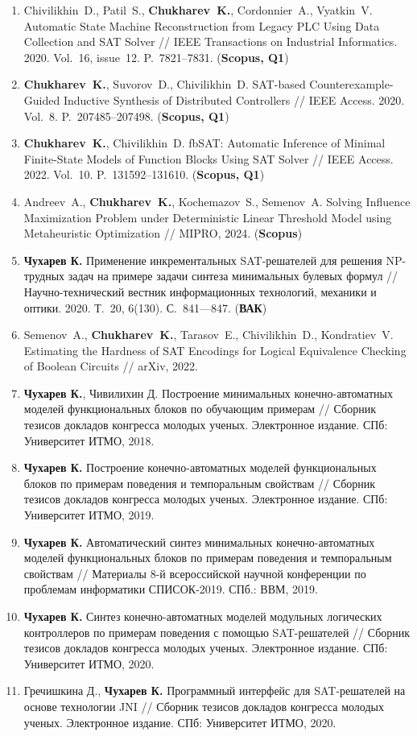 \begin{enumerate}[left=0pt]
    \item Chivilikhin~D., Patil~S., \textbf{Chukharev~K.}, Cordonnier~A., Vyatkin~V. Automatic State Machine Reconstruction from Legacy PLC Using Data Collection and SAT Solver // IEEE Transactions on Industrial Informatics. 2020. Vol.~16, issue~12. P.~7821–7831. (\textbf{Scopus, Q1})
    \item \textbf{Chukharev~K.}, Suvorov~D., Chivilikhin~D. SAT-based Counterexample-Guided Inductive Synthesis of Distributed Controllers // IEEE Access. 2020. Vol.~8. P.~207485–207498. (\textbf{Scopus, Q1})
    \item \textbf{Chukharev~K.}, Chivilikhin~D. fbSAT: Automatic Inference of Minimal Finite-State Models of Function Blocks Using SAT Solver // IEEE Access. 2022. Vol.~10. P.~131592–131610. (\textbf{Scopus, Q1})
    \item Andreev~A., \textbf{Chukharev~K.}, Kochemazov~S., Semenov~A. Solving Influence Maximization Problem under Deterministic Linear Threshold Model using Metaheuristic Optimization // MIPRO, 2024. (\textbf{Scopus})
    \item \textbf{Чухарев К.} Применение инкрементальных SAT-решателей для решения NP-трудных задач на примере задачи синтеза минимальных булевых формул // Научно-технический вестник информационных технологий, механики и оптики. 2020. Т.~20, 6(130). С.~841—847. (\textbf{ВАК})
    \item Semenov~A., \textbf{Chukharev~K.}, Tarasov~E., Chivilikhin~D., Kondratiev~V. Estimating the Hardness of SAT Encodings for Logical Equivalence Checking of Boolean Circuits // arXiv, 2022.
    \item \textbf{Чухарев К.}, Чивилихин Д. Построение минимальных конечно-автоматных моделей функциональных блоков по обучающим примерам // Сборник тезисов докладов конгресса молодых ученых. Электронное издание. СПб: Университет ИТМО, 2018.
    \item \textbf{Чухарев К.} Построение конечно-автоматных моделей функциональных блоков по примерам поведения и темпоральным свойствам // Сборник тезисов докладов конгресса молодых ученых. Электронное издание. СПб: Университет ИТМО, 2019.
    \item \textbf{Чухарев К.} Автоматический синтез минимальных конечно-автоматных моделей функциональных блоков по примерам поведения и темпоральным свойствам // Материалы 8-й всероссийской научной конференции по проблемам информатики СПИСОК-2019. СПб.: ВВМ, 2019.
    \item \textbf{Чухарев К.} Синтез конечно-автоматных моделей модульных логических контроллеров по примерам поведения с помощью SAT-решателей // Сборник тезисов докладов конгресса молодых ученых. Электронное издание. СПб: Университет ИТМО, 2020.
    \item Гречишкина Д., \textbf{Чухарев К.} Программный интерфейс для SAT-решателей на основе технологии JNI // Сборник тезисов докладов конгресса молодых ученых. Электронное издание. СПб: Университет ИТМО, 2020.
\end{enumerate}

